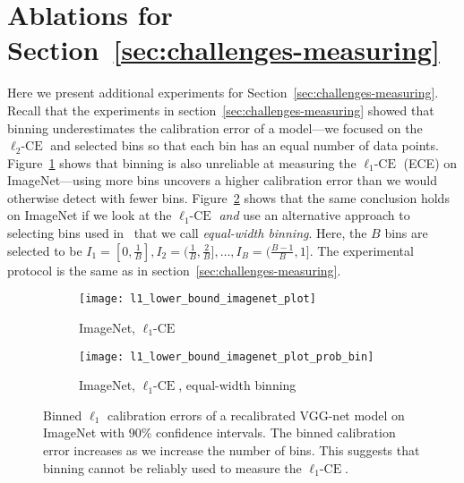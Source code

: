 \newpage
\section{Ablations for Section~\ref{sec:challenges-measuring}}
\label{sec:appendix_platt_experiments}

Here we present additional experiments for Section~\ref{sec:challenges-measuring}.
Recall that the experiments in section~\ref{sec:challenges-measuring} showed that binning underestimates the calibration error of a model---we focused on the $\ell_2\mbox{-CE}$ and selected bins so that each bin has an equal number of data points. Figure~\ref{fig:imagenet_lower_bound_l1} shows that binning is also unreliable at measuring the $\ell_1\mbox{-CE}$ (ECE) on ImageNet---using more bins uncovers a higher calibration error than we would otherwise detect with fewer bins. Figure~\ref{fig:imagenet_lower_bound_l1_prob} shows that the same conclusion holds on ImageNet if we look at the $\ell_1\mbox{-CE}$ \emph{and} use an alternative approach to selecting bins used in~\cite{guo2017calibration} that we call \emph{equal-width binning}. Here, the $B$ bins are selected to be $I_1 = [0, \frac{1}{B}], I_2 = (\frac{1}{B}, \frac{2}{B}], \dots, I_B = (\frac{B-1}{B}, 1]$. The experimental protocol is the same as in section~\ref{sec:challenges-measuring}.

\begin{figure}
     \centering
     \begin{subfigure}[b]{0.45\textwidth}
         \centering
         \texttt{[image: l1\_lower\_bound\_imagenet\_plot]}
         \caption{ImageNet, $\ell_1\mbox{-CE}$}
         \label{fig:imagenet_lower_bound_l1}
     \end{subfigure}
     \hfill
     \begin{subfigure}[b]{0.45\textwidth}
         \centering
         \texttt{[image: l1\_lower\_bound\_imagenet\_plot\_prob\_bin]}
         \caption{ImageNet, $\ell_1\mbox{-CE}$, equal-width binning}
         \label{fig:imagenet_lower_bound_l1_prob}
     \end{subfigure}
        \caption{
        Binned $\ell_1$ calibration errors of a recalibrated VGG-net model on ImageNet with $90\%$ confidence intervals. The binned calibration error increases as we increase the number of bins. This suggests that binning cannot be reliably used to measure the $\ell_1\mbox{-CE}$.
        }
        \label{fig:lower_bounds_l1_imagenet}
\end{figure}

